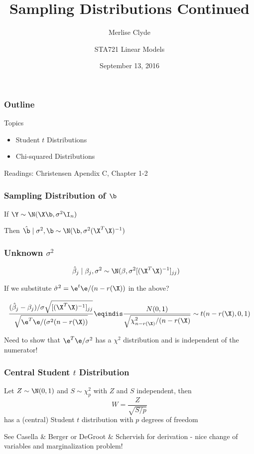 \documentclass{beamer}
\title{Sampling Distributions Continued}
\subtitle{Merlise Clyde}
\author{STA721 Linear Models}
\institute{Duke University}
\date{September 13, 2016}
\begin{document}
\maketitle

\begin{frame}\frametitle{Outline}
Topics 
  \begin{itemize}
  \item Student $t$ Distributions
  \item Chi-squared Distributions
  \end{itemize}

\vspace{24pt}
Readings:  Christensen Apendix C, Chapter 1-2 
\end{frame}

\begin{frame}
  \frametitle{Sampling Distribution of $\b$}
If  $\Y \sim \N(\X\b, \sigma^2 \I_n)$

Then $\hat{\b} \mid \sigma^2, \b \sim \N(\b, \sigma^2 (\X^T\X)^{-1})$
\vfill

\end{frame}


\begin{frame} \frametitle{Unknown $\sigma^2$}

  \begin{align*}
    \hat{\beta}_j \mid \beta_j, \sigma^2 & \sim \N(\beta, { \sigma^2}
                                           [(\X^T\X)^{-1}]_{jj})
  \end{align*}  \pause

If we substitute $\hat{\sigma}^2 = \e^t\e/(n-r(\X))$ in the above? \pause

$$
\frac{(\hat{\beta}_j - \beta_j)/ \sigma \sqrt{ [(\X^T\X)^{-1}]_{jj}}}
{\sqrt{\e^T\e/ (\sigma^2 (n - r(\X))} } \eqindis
\frac{N(0,1)}{\sqrt{\chi_{n-r(\X)}^2/(n - r(\X)}} \sim t(n - r(\X), 0 ,1)
$$

Need to show that $\e^T\e /\sigma^2$ has a $\chi^2$ distribution and
is independent of the numerator!
\end{frame}

\begin{frame}
  \frametitle{Central Student $t$ Distribution}
  \begin{definition}
    Let $Z \sim \N(0, 1)$ and $S \sim \chi^2_p$ with $Z$ and $S$
    independent, \pause then
$$ W = \frac{Z} {\sqrt{S/p}}$$
has a (central) Student $t$ distribution with $p$ degrees of freedom
  \end{definition}
\pause
 
See Casella \& Berger or DeGroot \& Schervish for derivation - nice change of variables and marginalization problem!
\end{frame}
\end{document}
